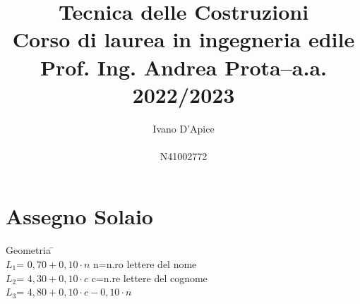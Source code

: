 \documentclass[a4paper,12pt, oneside]{book}
\title{\textbf{Tecnica delle Costruzioni}\\ \textbf{Corso di laurea in ingegneria edile}\\ \textbf{Prof. Ing. Andrea Prota–a.a. 2022/2023}}
\author{Ivano D'Apice\\\\ N41002772}
\date{}
\begin{document}
	\maketitle
	
	
	\newtheorem{teorema}{Teorema}
	\newtheorem{definizione}{Definizione}
	\newtheorem{esempio}{Esempio}
	\newtheorem{corollario}{Corollario}
	\newtheorem{lemma}{Lemma}
	\newtheorem{osservazione}{Osservazione}
	\newtheorem{nota}{Nota}
	\newtheorem{esercizio}{Esercizio}
	\tableofcontents
	\renewcommand{\chaptermark}[1]{%
		\markboth{\chaptername
			\ \thechapter.\ #1}{}}
	\renewcommand{\sectionmark}[1]{\markright{\thesection.\ #1}}
	
	\chapter{Assegno Solaio}
	    
    \begin{tabbing}
	 Geometria \hspace{10em} \= \hspace{1em} \\
	 $L_1$=  $0,70+0,10\cdot n$              \> n=n.ro lettere del nome    \\
	 $L_2$=  $4,30+0,10\cdot c$              \> c=n.re lettere del cognome \\ 
	 $L_3$=  $4,80+0,10\cdot c-0,10\cdot n$  \>                             
    \end{tabbing}	    

	\begin{figure}[H]
		\centering
		\hspace*{-.5cm}
		\caption{}
		\label{fig:travesolaio}
	\end{figure}
	
\end{document}
